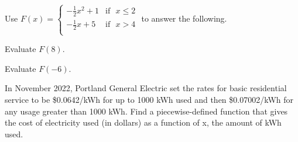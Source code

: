 \begin{myExit}
Use $F(x)=
			\begin{cases}
				-\frac{1}{2}x^2+1	&	\textrm{if}\ 	\ \	 x\leq2		\\
				-\frac{1}{2}x+5	&	\textrm{if}\ 	\ \	x> 4		\\
			\end{cases}$ to answer the following.
	\begin{enumerate}
	\begin{minipage}{0.5\linewidth}
		\item Evaluate $F(8)$.
	\end{minipage}
	\begin{minipage}{0.5\linewidth}
		\item Evaluate $F(-6)$.
	\end{minipage}			
	\end{enumerate}
\vfill
\vfill
\end{myExit}


\begin{myExit}
In November 2022, Portland General Electric set the rates for basic residential service to be \$0.0642/kWh for up to 1000 kWh used and then \$0.07002/kWh for any usage greater than 1000 kWh.  Find a piecewise-defined function that gives the cost of electricity used (in dollars) as a function of x, the amount of kWh used.
\vfill
\vfill
\vfill
\end{myExit}




